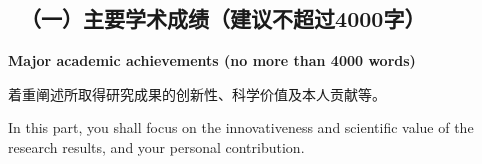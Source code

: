 
{\color{MsBlue} \subsection{\sihao \kaishu \quad \ 
\textbf{（一）主要学术成绩}（建议不超过4000字）}}

{\color{MsBlue} \xiaosihao {} 
\textbf{Major academic achievements (no more than 4000 words)}}

{\sihao \kaishu \color{MsBlue} 着重阐述所取得研究成果的创新性、科学价值及本人贡献等。}

{\color{MsBlue} \xiaosihao {} In this part, you shall 
focus on the innovativeness and scientific value of the research results, 
and your personal contribution.}



